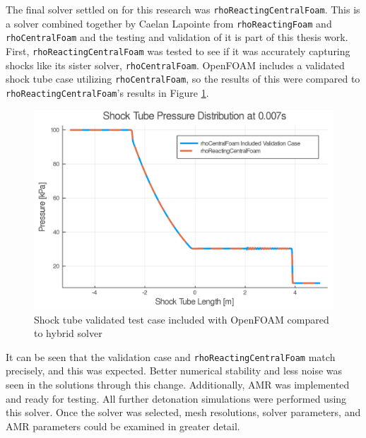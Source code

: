 The final solver settled on for this research was \verb|rhoReactingCentralFoam|. This is a solver combined together by Caelan Lapointe from \verb|rhoReactingFoam| and \verb|rhoCentralFoam| and the testing and validation of it is part of this thesis work. First, \verb|rhoReactingCentralFoam| was tested to see if it was accurately capturing shocks like its sister solver, \verb|rhoCentralFoam|. OpenFOAM includes a validated shock tube case utilizing \verb|rhoCentralFoam|, so the results of this were compared to \verb|rhoReactingCentralFoam|'s results in Figure \ref{fig:sod}. 
\begin{figure}[]
\centering
\includegraphics[width=0.85\linewidth]{./figs/shocktube.png} 
\caption{Shock tube validated test case included with OpenFOAM compared to hybrid solver}
\label{fig:sod}
\end{figure}%
\noindent It can be seen that the validation case and \verb|rhoReactingCentralFoam| match precisely, and this was expected. Better numerical stability and less noise was seen in the solutions through this change. Additionally, AMR was implemented and ready for testing. All further detonation simulations were performed using this solver. Once the solver was selected, mesh resolutions, solver parameters, and AMR parameters could be examined in greater detail. 
